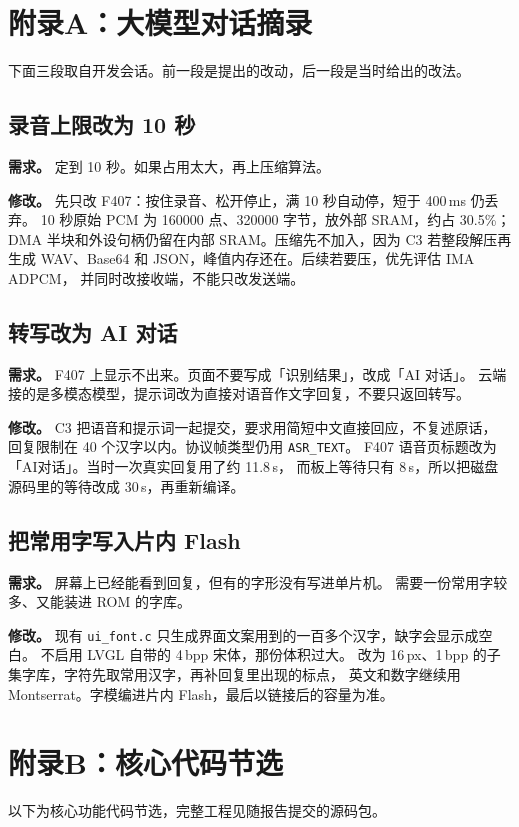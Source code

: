 \appendix

\section{附录A：大模型对话摘录}
\label{app:llm}
下面三段取自开发会话。前一段是提出的改动，后一段是当时给出的改法。

\subsection{录音上限改为 10 秒}
\textbf{需求。}
定到 10 秒。如果占用太大，再上压缩算法。

\textbf{修改。}
先只改 F407：按住录音、松开停止，满 10 秒自动停，短于 400\,ms 仍丢弃。
10 秒原始 PCM 为 160000 点、320000 字节，放外部 SRAM，约占 30.5\%；
DMA 半块和外设句柄仍留在内部 SRAM。压缩先不加入，因为 C3 若整段解压再生成
WAV、Base64 和 JSON，峰值内存还在。后续若要压，优先评估 IMA ADPCM，
并同时改接收端，不能只改发送端。

\subsection{转写改为 AI 对话}
\textbf{需求。}
F407 上显示不出来。页面不要写成「识别结果」，改成「AI 对话」。
云端接的是多模态模型，提示词改为直接对语音作文字回复，不要只返回转写。

\textbf{修改。}
C3 把语音和提示词一起提交，要求用简短中文直接回应，不复述原话，
回复限制在 40 个汉字以内。协议帧类型仍用 \texttt{ASR\_TEXT}。
F407 语音页标题改为「AI对话」。当时一次真实回复用了约 11.8\,s，
而板上等待只有 8\,s，所以把磁盘源码里的等待改成 30\,s，再重新编译。

\subsection{把常用字写入片内 Flash}
\textbf{需求。}
屏幕上已经能看到回复，但有的字形没有写进单片机。
需要一份常用字较多、又能装进 ROM 的字库。

\textbf{修改。}
现有 \texttt{ui\_font.c} 只生成界面文案用到的一百多个汉字，缺字会显示成空白。
不启用 LVGL 自带的 4\,bpp 宋体，那份体积过大。
改为 16\,px、1\,bpp 的子集字库，字符先取常用汉字，再补回复里出现的标点，
英文和数字继续用 Montserrat。字模编进片内 Flash，最后以链接后的容量为准。

\section{附录B：核心代码节选}
以下为核心功能代码节选，完整工程见随报告提交的源码包。


